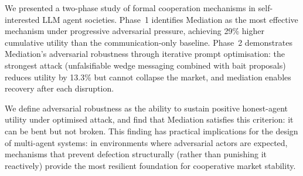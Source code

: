\documentclass{article}
\begin{document}
We presented a two-phase study of formal cooperation mechanisms in self-interested LLM agent societies. Phase~1 identifies Mediation as the most effective mechanism under progressive adversarial pressure, achieving 29\% higher cumulative utility than the communication-only baseline. Phase~2 demonstrates Mediation's adversarial robustness through iterative prompt optimisation: the strongest attack (unfalsifiable wedge messaging combined with bait proposals) reduces utility by 13.3\% but cannot collapse the market, and mediation enables recovery after each disruption.

We define adversarial robustness as the ability to sustain positive honest-agent utility under optimised attack, and find that Mediation satisfies this criterion: it can be bent but not broken. This finding has practical implications for the design of multi-agent systems: in environments where adversarial actors are expected, mechanisms that prevent defection structurally (rather than punishing it reactively) provide the most resilient foundation for cooperative market stability.

\end{document}
